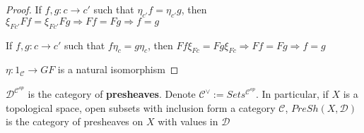 \documentclass[../main.tex]{subfiles}
\begin{document}
\begin{proof}
If $f,g:c\to c'$ such that $\eta_{c'}f=\eta_{c'}g$, then $\xi_{Fc'}Ff=\xi_{Fc'}Fg\Rightarrow Ff=Fg\Rightarrow f=g$ \par
If $f,g:c\to c'$ such that $f\eta_{c}=g\eta_{c}$, then $Ff\xi_{Fc}=Fg\xi_{Fc}\Rightarrow Ff=Fg\Rightarrow f=g$
\begin{center}
\end{center}
$\eta:1_{\mathscr C}\to GF$ is a natural isomorphism
\end{proof}

\begin{definition}
$\mathscr D^{\mathscr C^{op}}$ is the category of \textbf{presheaves}. Denote $\mathscr C^{\vee}:= Sets^{\mathscr C^{op}}$. In particular, if $X$ is a topological space, open subsets with inclusion form a category $\mathscr C$, $PreSh(X,\mathscr D)$ is the category of presheaves on $X$ with values in $\mathscr D$
\end{definition}
\end{document}
